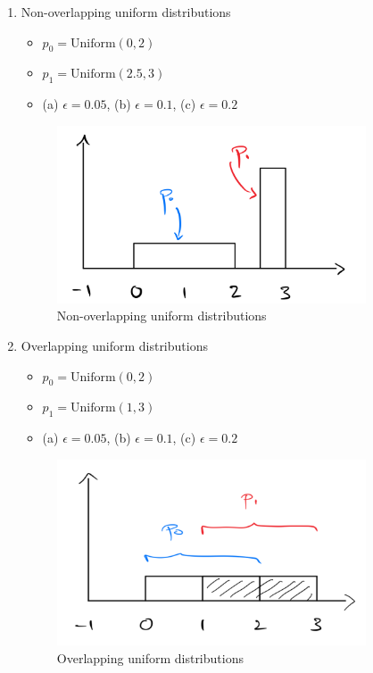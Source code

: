 \documentclass[11pt]{article}
\begin{document}
\newpage

\begin{enumerate}
	\item Non-overlapping uniform distributions 
	\begin{itemize}
		\item $p_0 = \text{Uniform}(0, 2)$
		\item $p_1 = \text{Uniform}(2.5, 3)$
		\item (a) $\epsilon = 0.05$, (b) $\epsilon = 0.1$, (c) $\epsilon = 0.2$
	\end{itemize}

\begin{center}
	\begin{figure}[h!]
	\includegraphics[width=260pt]{non-over.png}
	\caption{Non-overlapping uniform distributions}
	\end{figure}
\end{center}


\item Overlapping uniform distributions
	\begin{itemize}
		\item $p_0 = \text{Uniform}(0, 2)$
		\item $p_1 = \text{Uniform}(1, 3)$
		\item (a) $\epsilon = 0.05$, (b) $\epsilon = 0.1$, (c) $\epsilon = 0.2$
	\end{itemize}

\begin{center}
	\begin{figure}[h!]
	\includegraphics[width=260pt]{1.png}
	\caption{Overlapping uniform distributions}
	\end{figure}
\end{center}


\end{enumerate}
\end{document}
